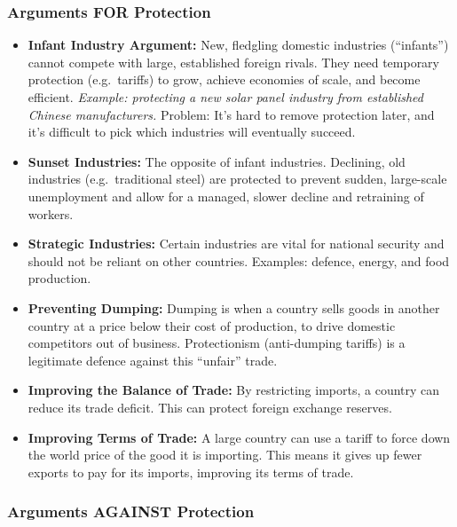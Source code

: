 \documentclass[11pt, a4paper, twoside]{book}
\begin{document}
\subsubsection{Arguments FOR Protection}

\begin{itemize}
  \item \textbf{Infant Industry Argument:} New, fledgling domestic industries (``infants'') cannot compete with large, established foreign rivals. They need temporary protection (e.g.\ tariffs) to grow, achieve economies of scale, and become efficient. \emph{Example: protecting a new solar panel industry from established Chinese manufacturers.} Problem: It's hard to remove protection later, and it's difficult to pick which industries will eventually succeed.

  \item \textbf{Sunset Industries:} The opposite of infant industries. Declining, old industries (e.g.\ traditional steel) are protected to prevent sudden, large-scale unemployment and allow for a managed, slower decline and retraining of workers.

  \item \textbf{Strategic Industries:} Certain industries are vital for national security and should not be reliant on other countries. Examples: defence, energy, and food production.

  \item \textbf{Preventing Dumping:} Dumping is when a country sells goods in another country at a price below their cost of production, to drive domestic competitors out of business. Protectionism (anti-dumping tariffs) is a legitimate defence against this ``unfair'' trade.

  \item \textbf{Improving the Balance of Trade:} By restricting imports, a country can reduce its trade deficit. This can protect foreign exchange reserves.

  \item \textbf{Improving Terms of Trade:} A large country can use a tariff to force down the world price of the good it is importing. This means it gives up fewer exports to pay for its imports, improving its terms of trade.
\end{itemize}

\subsubsection{Arguments AGAINST Protection}
\end{document}
